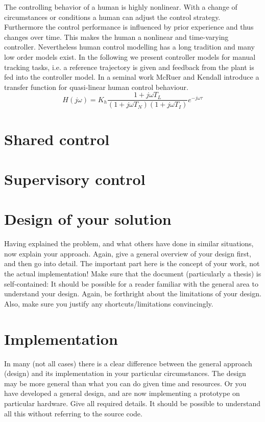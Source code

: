 \documentclass[a4paper,twoside, openright,12pt]{report}
\begin{document}
The controlling behavior of a human is highly nonlinear. With a change of circumstances or conditions a human can adjust the control strategy.  Furthermore the control performance is influenced by prior experience and thus changes over time. This makes the human a nonlinear and time-varying controller. Nevertheless human control modelling has a long tradition and many low order models exist. In the following we present controller models for manual tracking tasks, i.e. a reference trajectory is given and feedback from the plant is fed into the controller model. In a seminal work McRuer and Kendall introduce a transfer function for quasi-linear human control behaviour.
\begin{equation}
H(j\omega) = K_h\frac{1+j\omega T_L}{(1+j\omega T_N)(1+j\omega T_I)}e^{-j\omega \tau}
\end{equation} 
\section{Shared control}

\section{Supervisory control}

\section{Design of your solution}

Having explained the problem, and what others have done in similar situations, now explain your approach. Again, give a general overview of your design first, and then go into detail. The important part here is the concept of your work, not the actual implementation! Make sure that the document (particularly a thesis) is self-contained: It should be possible for a reader familiar with the general area to understand your design. Again, be forthright about the limitations of your design. Also, make sure you justify any shortcuts/limitations convincingly.

\section{Implementation}

In many (not all cases) there is a clear difference between the general approach (design) and its implementation in your particular circumstances. The design may be more general than what you can do given time and resources. Or you have developed a general design, and are now implementing a prototype on particular hardware. Give all required details. It should be possible to understand all this without referring to the source code. 
\end{document}
